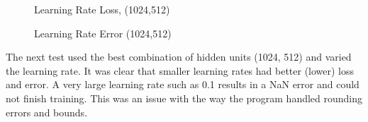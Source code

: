 \documentclass[10pt,a4paper]{article}
\begin{document}
\begin{figure}[h]
\begin{center}
	\caption{Learning Rate Loss, (1024,512)}
	\end{center}
\end{figure}

\begin{figure}[h]
\begin{center}
	\caption{Learning Rate Error (1024,512)}
	\end{center}
\end{figure}

	The next test used the best combination of hidden units (1024, 512) and varied the learning rate. It was clear that smaller learning rates had better (lower) loss and error. A very large learning rate such as 0.1 results in a NaN error and could not finish training. This was an issue with the way the program handled rounding errors and bounds.
\end{document}
